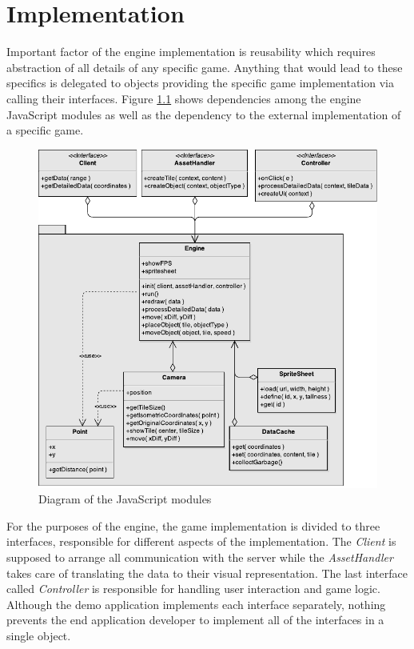 \documentclass[11pt,oneside, final]{fithesis2}
\begin{document}
\chapter{Implementation}
\label{implementation}
Important factor of the engine implementation is reusability which requires abstraction of all details of any specific game. Anything that would lead to these specifics is delegated to objects providing the specific game implementation via calling their interfaces. Figure \ref{classdiagram} shows dependencies among the engine JavaScript modules as well as the dependency to the external implementation of a specific game.

\begin{figure}[h]
	\centering
	\includegraphics[width=\textwidth]{thesis-classdiagram}
	\caption{Diagram of the JavaScript modules}
	\label{classdiagram}
\end{figure}

For the purposes of the engine, the game implementation is divided to three interfaces, responsible for different aspects of the implementation. The \emph{Client} is supposed to arrange all communication with the server while the \emph{AssetHandler} takes care of translating the data to their visual representation. The last interface called \emph{Controller} is responsible for handling user interaction and game logic. Although the demo application implements each interface separately, nothing prevents the end application developer to implement all of the interfaces in a single object.
\end{document}
